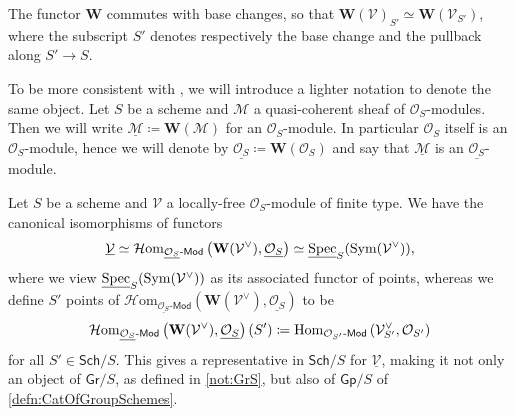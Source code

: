 \begin{prop}
	The functor $\mathbf{W}$ commutes with base changes,
	so that $\mathbf{W}(\mathcal{V})_{S'} \simeq \mathbf{W}(\mathcal{V}_{S'})$,
	where the subscript $S'$ denotes respectively the base change 
	and the pullback along $S' \to S$.
\end{prop}


\begin{ntt}\label{not:fppfOsModule}
	To be more consistent with \cite{Messing}, we will introduce a 
	lighter notation to denote the same object.
	Let $S$ be a scheme and $\mathcal{M}$ a quasi-coherent sheaf of $\mathcal{O}_{ S }$-modules.
	Then we will write $\underline{\mathcal{M}} \coloneqq \mathbf{W}(\mathcal{M})$ for
	an $\mathcal{O}_{ S }$-module.
	In particular $\mathcal{O}_{ S }$ itself is an $\mathcal{O}_{ S }$-module, hence
	we will denote by $\underline{\mathcal{O}_{ S }} \coloneqq \mathbf{W}(\mathcal{O}_{ S })$
	and say that $\underline{\mathcal{M}}$ is an $\underline{\mathcal{O}_{ S }}$-module.
\end{ntt}


\begin{prop}\label{representabilityVectSGroup}
	Let \(S\) be a scheme and \(\mathcal{V}\) a locally-free 
	\(\mathcal{O}_{ S }\)-module of finite type.
	We have the canonical isomorphisms of functors
	\begin{equation*}
		\underline{\mathcal{V}} \simeq
		\mathcal{H}\mathrm{om}_{ \underline{\mathcal{O}_{ S }}\text{-}\mathsf{Mod} }
		\left(\mathbf{W}(\mathcal{V}^\vee) , \underline{\mathcal{O}_{ S }} \right) \simeq
		\underline{\operatorname{Spec}}_S(\operatorname{Sym}(\mathcal{V}^\vee))
	,\end{equation*}
	where we view \(\underline{\operatorname{Spec}}_S(\operatorname{Sym}(\mathcal{V}^\vee))\)
	as its associated functor of points, whereas
	we define \(S'\) points of
	\(\mathcal{H}\mathrm{om}_{ \underline{\mathcal{O}_{ S }}\text{-}\mathsf{Mod} }
		\left(\mathbf{W}(\mathcal{V}^\vee) , \underline{\mathcal{O}_{ S }} \right)\) 
		to be 
	\begin{equation*}
		\mathcal{H}\mathrm{om}_{ \underline{\mathcal{O}_{ S }}\text{-}\mathsf{Mod} }
		\left(\mathbf{W}(\mathcal{V}^\vee) , \underline{\mathcal{O}_{ S }} \right) (S') \coloneqq
		\operatorname{Hom}_{ \mathcal{O}_{ S' }\text{-}\mathsf{Mod} }
		\left(\mathcal{V}^\vee_{ S' }, \mathcal{O}_{ S' }\right)
	\end{equation*}
	for all \(S' \in \mathsf{Sch}/ S \).
	This gives a representative in $\mathsf{Sch}/S$ for 
	$\underline{\mathcal{V}}$, making it not only an object of $\mathsf{Gr}/S$,
	as defined in \cref{not:GrS}, but also of $\mathsf{Gp}/S$
	of \cref{defn:CatOfGroupSchemes}.
\end{prop}


